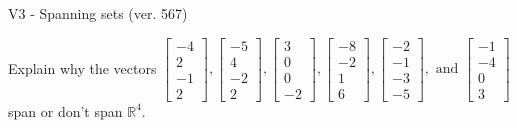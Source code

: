 \begin{exercise}
  \begin{exerciseTitle}V3 - Spanning sets (ver. 567)\end{exerciseTitle}
  \begin{exerciseStatement}
    Explain why the vectors \(\left[\begin{array}{r}
-4 \\
2 \\
-1 \\
2
\end{array}\right] , \left[\begin{array}{r}
-5 \\
4 \\
-2 \\
2
\end{array}\right] , \left[\begin{array}{r}
3 \\
0 \\
0 \\
-2
\end{array}\right] , \left[\begin{array}{r}
-8 \\
-2 \\
1 \\
6
\end{array}\right] , \left[\begin{array}{r}
-2 \\
-1 \\
-3 \\
-5
\end{array}\right] , \text{ and } \left[\begin{array}{r}
-1 \\
-4 \\
0 \\
3
\end{array}\right]\) span or don't span \(\mathbb{R}^4\). 
	



\end{exerciseStatement}
\end{exercise}
